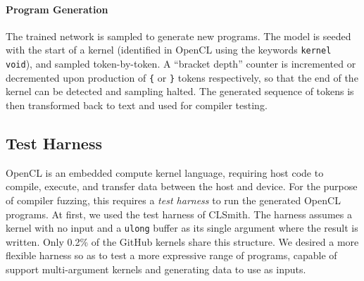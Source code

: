 
\paragraph{Program Generation} The trained network is sampled to generate new programs. The model is seeded with the start of a kernel (identified in OpenCL using the keywords \texttt{kernel void}), and sampled token-by-token. A ``bracket depth'' counter is incremented or decremented upon production of \texttt{\{} or \texttt{\}} tokens respectively, so that the end of the kernel can be detected and sampling halted. The generated sequence of tokens is then transformed back to text and used for compiler testing.


\subsection{Test Harness\label{sec:test-harness}}


OpenCL is an embedded compute kernel language, requiring host code to compile, execute, and transfer data between the host and device. For the purpose of compiler fuzzing, this requires a \emph{test harness} to run the generated OpenCL programs. At first, we used the test harness of CLSmith. The harness assumes a kernel with no input and a \texttt{ulong} buffer as its single argument where the result is written. Only 0.2\% of the GitHub kernels share this structure. We desired a more flexible harness so as to test a more expressive range of programs, capable of support multi-argument kernels and generating data to use as inputs.

